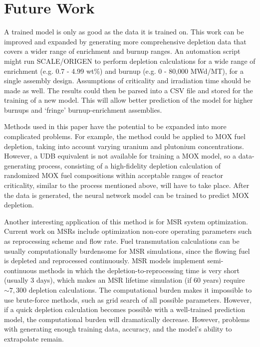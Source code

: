 \section{Future Work}

A trained model is only as good as the data it is trained on.
This work can be improved and expanded by generating
more comprehensive depletion data that covers a wider
range of enrichment and burnup ranges. An automation
script might run SCALE/ORIGEN to perform depletion calculations
for a wide range of enrichment (e.g. 0.7 - 4.99 wt\%) and burnup (e.g. 0 - 80,000 MWd/MT),
for a single assembly design. Assumptions of criticality
and irradiation time should be made as well. The results
could then be parsed into a \gls{CSV} file and stored for
the training of a new model. This will allow better
prediction of the model for higher burnups and `fringe'
burnup-enrichment assemblies.

Methods used in this paper have the potential to be expanded into more
complicated problems. For example, the method
could be applied to \gls{MOX} fuel depletion, taking
into account varying uranium and plutonium concentrations.
However, a \gls{UDB} equivalent is not available
for training a \gls{MOX} model, so a
data-generating process, consisting of a high-fidelity
depletion calculation of randomized \gls{MOX} fuel
compositions within acceptable ranges of reactor
criticality, similar to the process mentioned above,
will have to take place. After the data
is generated, the neural network model can be trained
to predict \gls{MOX} depletion.

Another interesting application of this method is for
\gls{MSR} system optimization. Current work on
\glspl{MSR} include optimization non-core operating
parameters such as reprocessing scheme and flow rate.
Fuel transmutation calculations
can be usually computationally burdensome for \gls{MSR}
simulations, since the flowing fuel is depleted and
reprocessed continuously. \gls{MSR} models implement semi-continuous
methods in which the depletion-to-reprocessing time is
very short (usually 3 days), which makes an
\gls{MSR} lifetime simulation (if 60 years)
require $\sim 7,300$ depletion calculations.
The computational burden
makes it impossible to use brute-force methods,
such as grid search of all possible parameters.
However, if a quick depletion calculation becomes possible
with a well-trained prediction model, the
computational burden will dramatically decrease.
However, problems with generating enough
training data, accuracy, and the model's ability to
extrapolate remain.